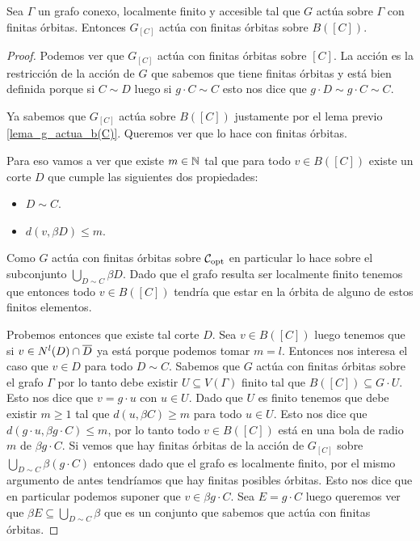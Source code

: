 \documentclass[tesis.tex]{subfiles}
\begin{document}
\begin{lema}\label{lema_accion_b(C)}
	Sea $\Gamma$ un grafo conexo, localmente finito y accesible tal que $G$ actúa sobre $\Gamma$ con finitas órbitas.
	Entonces $G_{[C]}$ actúa con finitas órbitas sobre $B([C])$.
\end{lema}
\begin{proof}
	Podemos ver que $G_{[C]}$ actúa con finitas órbitas sobre $[C]$.
	La acción es la restricción de la acción de $G$ que sabemos que tiene finitas órbitas y está bien definida porque si $C \sim D$ luego si $g \cdot C \sim C$ esto nos dice que $g \cdot D \sim g \cdot C \sim C$.
	
	Ya sabemos que $G_{[C]}$ actúa sobre $B([C])$ justamente por el lema previo \ref{lema_g_actua_b(C)}.
	Queremos ver que lo hace con finitas órbitas.
	
	Para eso vamos a ver que existe $m \in \mathbb{N}$ tal que para todo $v \in B([C])$ existe un corte $D$ que cumple las siguientes dos propiedades:
	\begin{itemize}
		\item $D \sim C$.
		\item $d(v,\beta D) \le m$.
	\end{itemize}
	
	Como $G$ actúa con finitas órbitas sobre ${\cal C}_{\text{opt}}$ en particular lo hace sobre el subconjunto $\bigcup_{D \sim C} \beta D$.
	Dado que el grafo resulta ser localmente finito tenemos que entonces todo $v \in B([C])$ tendría que estar en la órbita de alguno de estos finitos elementos.
	
	Probemos entonces que existe tal corte $D$.
	Sea $v \in B([C])$ luego tenemos que si $v \in N^l(D) \cap \overline D$ ya está porque podemos tomar $m=l$.
	Entonces nos interesa el caso que $v \in D$ para todo $D \sim C$.
	Sabemos que $G$ actúa con finitas órbitas sobre el grafo $\Gamma$ por lo tanto debe existir $U \subseteq V(\Gamma)$ finito tal que $B([C]) \subseteq G \cdot U$.
	Esto nos dice que $v = g \cdot u$ con $u \in U$.
	Dado que $U$ es finito tenemos que debe existir $m \ge 1$ tal que $d(u,\beta C) \ge m$ para todo $u \in U$.
	Esto nos dice que $d(g \cdot u, \beta g \cdot C) \le m$, por lo tanto todo $v \in B([C])$ está en una bola de radio $m$ de $\beta g \cdot C$.
	Si vemos que hay finitas órbitas de la acción de $G_{[C]}$ sobre $\bigcup_{D \sim C} \beta (g \cdot C)$ entonces dado que el grafo es localmente finito, por el mismo argumento de antes tendríamos que hay finitas posibles órbitas.
	Esto nos dice que en particular podemos suponer que $v \in \beta g \cdot C$.
	Sea $E = g \cdot C$ luego queremos ver que $\beta E \subseteq \bigcup_{D \sim C} \beta $ que es un conjunto que sabemos que actúa con finitas órbitas.
	

\end{proof}
\end{document}
